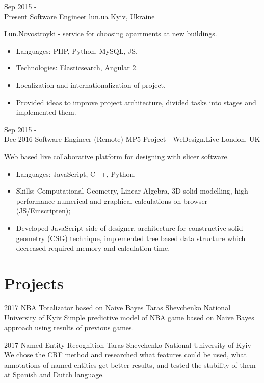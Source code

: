 \documentclass[letterpaper]{twentysecondcv} %
\begin{document}
\begin{twenty} %
	\twentyitem
    	{Sep 2015 - \\Present}
        {Software Engineer}
        {lun.ua}
        {Kyiv, Ukraine}
        {Lun.Novostroyki - service for choosing apartments at new buildings.
        {\begin{itemize}
        \item Languages: PHP, Python, MySQL, JS.
	\item Technologies: Elasticsearch, Angular 2.
        \item Localization and internationalization of project.
        \item Provided ideas to improve project architecture, divided tasks into stages and implemented them. 
        \end{itemize}}
        }
        
    \twentyitem
   	{Sep 2015 - \\Dec 2016}
        {Software Engineer (Remote)}
        {MP5 Project - WeDesign.Live}
        {London, UK}
        {Web based live collaborative platform for designing with slicer software.
        {\begin{itemize}
        \item Languages: JavaScript, C++, Python.
        \item Skills: Computational Geometry, Linear Algebra,  3D solid modelling, high performance numerical and graphical calculations on browser (JS/Emscripten); 
        \item Developed JavaScript side of designer, architecture for constructive solid geometry (CSG) technique, implemented tree based data structure which decreased required memory and calculation time.
         \end{itemize}}
        }
\end{twenty}


\section{Projects}
\begin{twenty}
	\twentyitem
    	{2017}
        {NBA Totalizator based on Naive Bayes}
         {}
        {Taras Shevchenko National University of Kyiv}
        {Simple predictive model of NBA game based on Naive Bayes approach using results of previous games.}
\end{twenty}
\begin{twenty}
	\twentyitem
    	{2017}
        {Named Entity Recognition}
         {}
        {Taras Shevchenko National University of Kyiv}
        {We chose the CRF method and researched what features could be used, what annotations of named entities get better results, and tested the stability of them at Spanish and Dutch language. }
\end{twenty}
\end{document}
